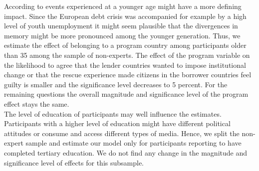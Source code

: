  According to \cite{baumeister} events experienced at a younger age might have a more defining impact. Since the European debt crisis was accompanied for example by a high level of youth unemployment it might seem plausible that the divergences in memory might be more pronounced among the younger generation. Thus, we estimate the effect of belonging to a program country among participants older than 35 among the sample of non-experts.  The effect of the program variable on the likelihood to agree that the lender countries wanted to impose institutional change or that the rescue experience made citizens in the borrower countries feel guilty is smaller and the significance level decreases to 5 percent. For the remaining questions the overall magnitude and significance level of the program effect stays the same. 
\\
The level of education of participants may well influence the estimates. Participants with a higher level of education might have different political attitudes or consume and access different types of media. Hence, we split the non-expert sample and estimate our model only for participants reporting to have completed tertiary education. We do not find any change in the magnitude and significance level of effects for this subsample. 
\\
